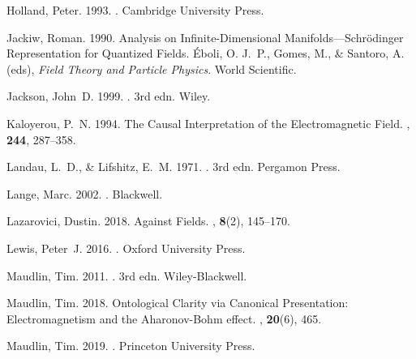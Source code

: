 \documentclass[12pt,secnumarabic,amsmath,amssymb,balancelastpage,nofootinbib]{article}
\begin{document}
\begin{thebibliography}{}
Holland, Peter. 1993.
.
\newblock Cambridge University Press.

Jackiw, Roman. 1990.
\newblock Analysis on Infinite-Dimensional Manifolds---Schr\"{o}dinger
  Representation for Quantized Fields.
 \'{E}boli, O. J.~P., Gomes, M., \& Santoro,
  A. (eds), {\em Field Theory and Particle Physics}.
\newblock World Scientific.

Jackson, John~D. 1999.
. 3rd edn.
\newblock Wiley.

Kaloyerou, P.~N. 1994.
\newblock The Causal Interpretation of the Electromagnetic Field.
, {\bf 244}, 287--358.

Landau, L.~D., \& Lifshitz, E.~M. 1971.
. 3rd edn.
\newblock Pergamon Press.

Lange, Marc. 2002.
.
\newblock Blackwell.

Lazarovici, Dustin. 2018.
\newblock Against Fields.
, {\bf 8}(2),
  145--170.

Lewis, Peter~J. 2016.
.
\newblock Oxford University Press.

Maudlin, Tim. 2011.
. 3rd edn.
\newblock Wiley-Blackwell.

Maudlin, Tim. 2018.
\newblock Ontological Clarity via Canonical Presentation: Electromagnetism and
  the Aharonov-Bohm effect.
, {\bf 20}(6), 465.

Maudlin, Tim. 2019.
.
\newblock Princeton University Press.


\end{thebibliography}
\end{document}
